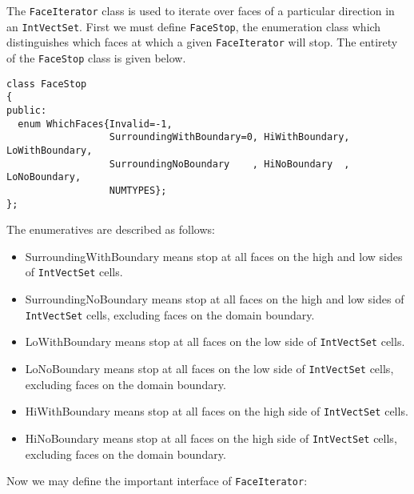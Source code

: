The {\tt FaceIterator} class is used to iterate
over faces of a particular direction in an {\tt IntVectSet}.
First we must define {\tt FaceStop},
the enumeration class which distinguishes which faces
at which a given {\tt FaceIterator} will stop.  The entirety
of the {\tt FaceStop} class is given below.
\begin{small}
\begin{verbatim}
class FaceStop
{
public:
  enum WhichFaces{Invalid=-1, 
                  SurroundingWithBoundary=0, HiWithBoundary, LoWithBoundary, 
                  SurroundingNoBoundary    , HiNoBoundary  , LoNoBoundary, 
                  NUMTYPES};
};
\end{verbatim}
\end{small}
The enumeratives are described as follows:
\begin{itemize}
\item SurroundingWithBoundary  means stop at all faces on the high and
low sides of {\tt IntVectSet} cells.  
\item SurroundingNoBoundary  means stop at all faces on the high and
low sides of {\tt IntVectSet} cells, excluding faces on the domain boundary. 
\item LoWithBoundary  means stop at all faces on the      low side of
{\tt IntVectSet} cells. 
\item LoNoBoundary  means stop at all faces on the     low side of
{\tt IntVectSet} cells, excluding faces on the domain boundary. 
\item HiWithBoundary  means stop at all faces on the      high side of
{\tt IntVectSet} cells. 
\item HiNoBoundary  means stop at all faces on the     high side of
{\tt IntVectSet} cells, excluding faces on the domain boundary. 
\end{itemize}
Now we may define the important interface of {\tt FaceIterator}:
